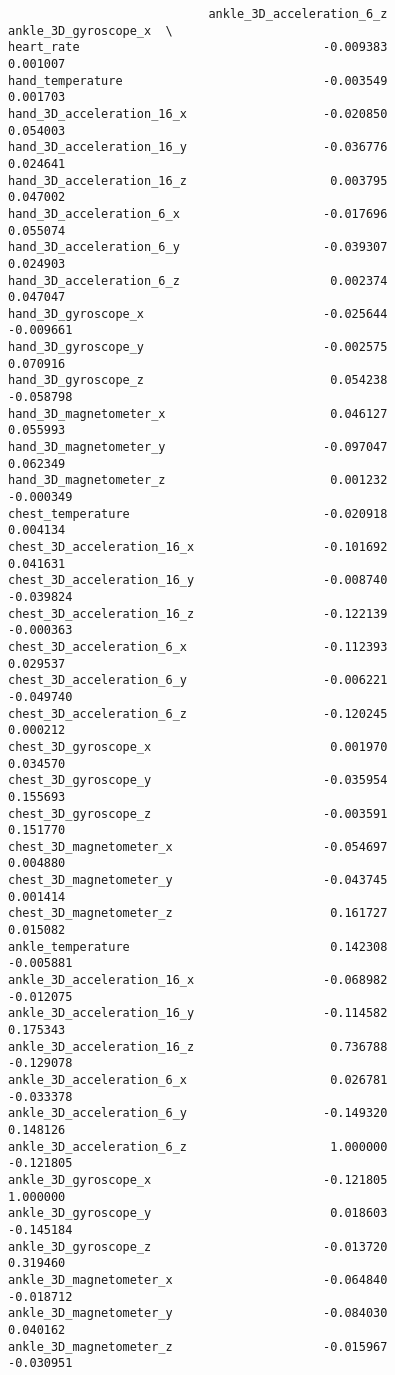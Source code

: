 \documentclass[11pt]{article}
\begin{document}
\begin{verbatim}
                            ankle_3D_acceleration_6_z  ankle_3D_gyroscope_x  \
heart_rate                                  -0.009383              0.001007   
hand_temperature                            -0.003549              0.001703   
hand_3D_acceleration_16_x                   -0.020850              0.054003   
hand_3D_acceleration_16_y                   -0.036776              0.024641   
hand_3D_acceleration_16_z                    0.003795              0.047002   
hand_3D_acceleration_6_x                    -0.017696              0.055074   
hand_3D_acceleration_6_y                    -0.039307              0.024903   
hand_3D_acceleration_6_z                     0.002374              0.047047   
hand_3D_gyroscope_x                         -0.025644             -0.009661   
hand_3D_gyroscope_y                         -0.002575              0.070916   
hand_3D_gyroscope_z                          0.054238             -0.058798   
hand_3D_magnetometer_x                       0.046127              0.055993   
hand_3D_magnetometer_y                      -0.097047              0.062349   
hand_3D_magnetometer_z                       0.001232             -0.000349   
chest_temperature                           -0.020918              0.004134   
chest_3D_acceleration_16_x                  -0.101692              0.041631   
chest_3D_acceleration_16_y                  -0.008740             -0.039824   
chest_3D_acceleration_16_z                  -0.122139             -0.000363   
chest_3D_acceleration_6_x                   -0.112393              0.029537   
chest_3D_acceleration_6_y                   -0.006221             -0.049740   
chest_3D_acceleration_6_z                   -0.120245              0.000212   
chest_3D_gyroscope_x                         0.001970              0.034570   
chest_3D_gyroscope_y                        -0.035954              0.155693   
chest_3D_gyroscope_z                        -0.003591              0.151770   
chest_3D_magnetometer_x                     -0.054697              0.004880   
chest_3D_magnetometer_y                     -0.043745              0.001414   
chest_3D_magnetometer_z                      0.161727              0.015082   
ankle_temperature                            0.142308             -0.005881   
ankle_3D_acceleration_16_x                  -0.068982             -0.012075   
ankle_3D_acceleration_16_y                  -0.114582              0.175343   
ankle_3D_acceleration_16_z                   0.736788             -0.129078   
ankle_3D_acceleration_6_x                    0.026781             -0.033378   
ankle_3D_acceleration_6_y                   -0.149320              0.148126   
ankle_3D_acceleration_6_z                    1.000000             -0.121805   
ankle_3D_gyroscope_x                        -0.121805              1.000000   
ankle_3D_gyroscope_y                         0.018603             -0.145184   
ankle_3D_gyroscope_z                        -0.013720              0.319460   
ankle_3D_magnetometer_x                     -0.064840             -0.018712   
ankle_3D_magnetometer_y                     -0.084030              0.040162   
ankle_3D_magnetometer_z                     -0.015967             -0.030951   


\end{verbatim}
\end{document}
